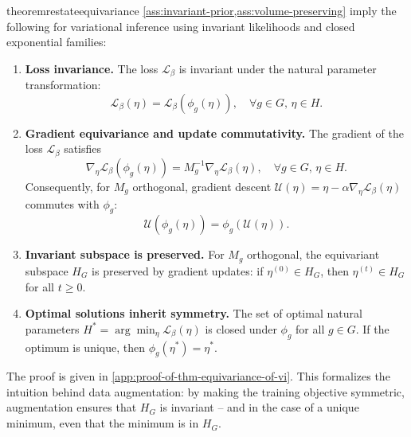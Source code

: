 \documentclass{article}
\begin{document}
\begin{restatable}[Equivariance of VI]{theorem}{restateequivariance}
\label{thm:equivariance-of-vi}
    \cref{ass:invariant-prior,ass:volume-preserving} imply the following for variational inference using  invariant likelihoods and closed exponential families:
    \begin{enumerate}[label=(\roman*)]
        \item \textbf{Loss invariance.} The loss $\mathcal{L}_{\beta}$ is invariant under the natural parameter transformation:
        \begin{equation}
            \mathcal{L}_{\beta}(\eta) = \mathcal{L}_{\beta}(\phi_{g}(\eta)), \quad \forall g \in G,\, \eta \in H.
        \end{equation}
        \item \textbf{Gradient equivariance and update commutativity.} The gradient of the loss $\mathcal{L}_{\beta}$ satisfies
        \begin{equation}
            \nabla_{\eta} \mathcal{L}_{\beta}(\phi_{g}(\eta)) = M_{g}^{-1} \nabla_{\eta} \mathcal{L}_{\beta}(\eta), \quad \forall g \in G,\, \eta \in H.
        \end{equation}
        Consequently, for $M_{g}$ orthogonal, gradient descent $\mathcal{U}(\eta) = \eta - \alpha \nabla_{\eta} \mathcal{L}_{\beta}(\eta)$ commutes with $\phi_{g}$:\begin{equation} \label{eq:update_commute}
            \mathcal{U}(\phi_{g}(\eta)) = \phi_{g}(\mathcal{U}(\eta)).
        \end{equation}
        \item \textbf{Invariant subspace is preserved.} For $M_{g}$ orthogonal, the equivariant subspace $H_{G}$
        is preserved by gradient updates: if $\eta^{(0)} \in H_{G}$, then $\eta^{(t)} \in H_{G}$ for all $t \geq 0$.
        \item \textbf{Optimal solutions inherit symmetry.} The set of optimal natural parameters $H^{\ast} = \arg\min_{\eta} \mathcal{L}_{\beta}(\eta)$ is closed under $\phi_{g}$ for all $g \in G$. If the optimum is unique, then $\phi_{g}(\eta^{\ast}) = \eta^{\ast}$.
    \end{enumerate}
\end{restatable}

The proof is given in \cref{app:proof-of-thm-equivariance-of-vi}. This formalizes the intuition behind data augmentation: by making the training objective symmetric, augmentation ensures that $H_G$ is invariant -- and in the case of a unique minimum, even that the minimum is in $H_G$.
\end{document}
